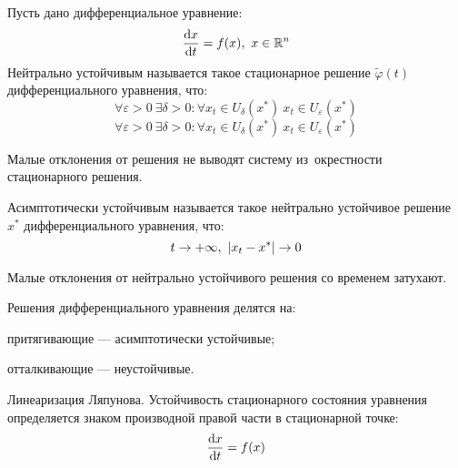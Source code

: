 Пусть дано дифференциальное уравнение:
$$\frac{\diff x}{\diff t}=f(x),\ x\in\mathbb{R}^n$$
{\bold Нейтрально устойчивым} называется такое {\ital стационарное} решение $\tilde{\varphi}(t)$ дифференциального уравнения, что:
$$\forall\varepsilon\greater 0\ \exists\delta\greater 0\colon\forall x_t\in U_\delta(x^*)\ x_t\in U_\varepsilon(x^*)$$
$$\forall\varepsilon\greater 0\ \exists\delta\greater 0\colon\forall x_t\in U_\delta(x^*)\ x_t\in U_\varepsilon(x^*)$$
\begin{theorem}
Малые отклонения от решения не выводят систему из~окрестности стационарного решения.
\end{theorem}
{\bold Асимптотически устойчивым} называется такое {\ital нейтрально устойчивое} решение $x^*$ дифференциального уравнения, что:
$$t\to+\infty,\ \left|x_t-x^*\right|\to 0$$
\begin{theorem}
Малые отклонения от нейтрально устойчивого решения со временем затухают.
\end{theorem}
Решения дифференциального уравнения делятся на:
\begin{list*}
\item{\bold притягивающие} --- асимптотически устойчивые;
\item{\bold отталкивающие} --- неустойчивые.
\end{list*}
\begin{theorem}
{\bold Линеаризация Ляпунова.} Устойчивость стационарного состояния уравнения определяется знаком производной правой части в стационарной точке:
$$\frac{\text{d} x}{\text{d} t}=f(x)$$
\end{theorem}
